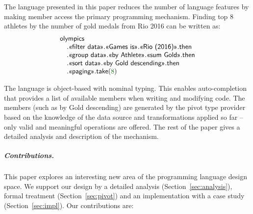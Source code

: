 \documentclass[a4paper,UKenglish]{lipics-v2016}
\theoremstyle{plain}
\theoremstyle{definition}
\newcommand{\num}[1]{\textcolor{numclr}{#1}}
\newcommand{\ident}[1]{\textnormal{\sffamily #1}}
\newcommand{\qident}[1]{\textnormal{\sffamily \guillemotleft #1\guillemotright}}
\begin{document}
The language presented in this paper reduces the number of language features by making member access
the primary programming mechanism. Finding top 8 athletes by the number of gold medals from Rio 2016 
can be written as:
%
\begin{equation*}
\begin{array}{l}
\ident{olympics}\\
\quad.\qident{filter data}.\qident{Games is}.\qident{Rio (2016)}.\ident{then}\\
\quad.\qident{group data}.\qident{by Athlete}.\qident{sum Gold}.\ident{then}\\
\quad.\qident{sort data}.\qident{by Gold descending}.\ident{then}\\
\quad.\qident{paging}.\ident{take}(\num{8})\\
\end{array}
\end{equation*}

\noindent
The language is object-based with nominal typing. This enables auto-completion that  
provides a list of available members when writing and modifying code. The members (such as 
\qident{by Gold descending}) are generated by the pivot type provider based on the knowledge of
the data source and transformations applied so far -- only valid and meaningful 
operations are offered. The rest of the paper gives a detailed analysis and description of the mechanism.

\subparagraph{Contributions.} This paper explores an interesting new area of the 
programming language design space. We support our design by a detailed analysis (Section~\ref{sec:analysis}), 
formal treatment (Section~\ref{sec:pivot}) and an implementation with 
a case study (Section~\ref{sec:impl}). Our contributions are:
\end{document}
